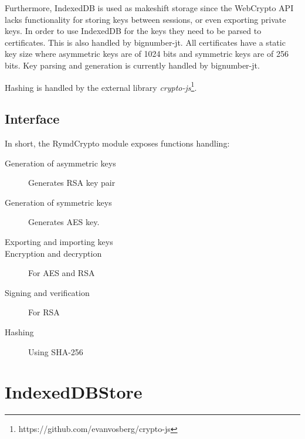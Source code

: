 Furthermore, IndexedDB is used as makeshift storage since the WebCrypto API lacks functionality for storing keys between sessions, or even exporting private keys. In order to use IndexedDB for the keys they need to be parsed to certificates. This is also handled by bignumber-jt. All certificates have a static key size where asymmetric keys are of 1024 bits and symmetric keys are of 256 bits. Key parsing and generation is currently handled by bignumber-jt.

Hashing is handled by the external library \emph{crypto-js}\footnote{https://github.com/evanvosberg/crypto-js}.

\subsection{Interface}

In short, the RymdCrypto module exposes functions handling:
\begin{description}
  \item[Generation of asymmetric keys] Generates RSA key pair
  \item[Generation of symmetric keys] Generates AES key.
  \item[Exporting and importing keys]
  \item[Encryption and decryption] For AES and RSA
  \item[Signing and verification] For RSA
  \item[Hashing] Using SHA-256
\end{description}


\section{IndexedDBStore}
\label{sec:indexeddbstore}

